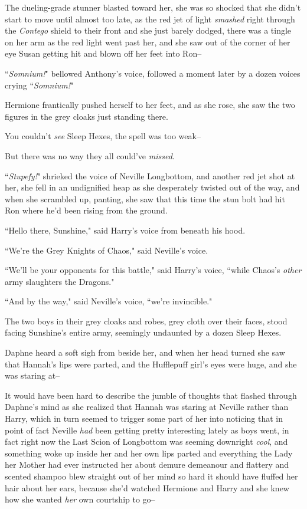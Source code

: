 The dueling-grade stunner blasted toward her, she was so shocked that she didn't start to move until almost too late, as the red jet of light \emph{smashed} right through the \emph{Contego} shield to their front and she just barely dodged, there was a tingle on her arm as the red light went past her, and she saw out of the corner of her eye Susan getting hit and blown off her feet into Ron\---

``\emph{Somnium!}" bellowed Anthony's voice, followed a moment later by a dozen voices crying ``\emph{Somnium!}"

Hermione frantically pushed herself to her feet, and as she rose, she saw the two figures in the grey cloaks just standing there.

You couldn't \emph{see} Sleep Hexes, the spell was too weak\---

But there was no way they all could've \emph{missed}.

``\emph{Stupefy!}" shrieked the voice of Neville Longbottom, and another red jet shot at her, she fell in an undignified heap as she desperately twisted out of the way, and when she scrambled up, panting, she saw that this time the stun bolt had hit Ron where he'd been rising from the ground.

``Hello there, Sunshine," said Harry's voice from beneath his hood.

``We're the Grey Knights of Chaos," said Neville's voice.

``We'll be your opponents for this battle," said Harry's voice, ``while Chaos's \emph{other} army slaughters the Dragons."

``And by the way," said Neville's voice, ``we're invincible."

\later

The two boys in their grey cloaks and robes, grey cloth over their faces, stood facing Sunshine's entire army, seemingly undaunted by a dozen Sleep Hexes.

Daphne heard a soft sigh from beside her, and when her head turned she saw that Hannah's lips were parted, and the Hufflepuff girl's eyes were huge, and she was staring at\---

It would have been hard to describe the jumble of thoughts that flashed through Daphne's mind as she realized that Hannah was staring at Neville rather than Harry, which in turn seemed to trigger some part of her into noticing that in point of fact Neville \emph{had} been getting pretty interesting lately as boys went, in fact right now the Last Scion of Longbottom was seeming downright \emph{cool}, and something woke up inside her and her own lips parted and everything the Lady her Mother had ever instructed her about demure demeanour and flattery and scented shampoo blew straight out of her mind so hard it should have fluffed her hair about her ears, because she'd watched Hermione and Harry and she knew how she wanted \emph{her} own courtship to go\---

